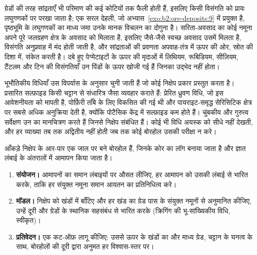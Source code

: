 ग्रेडों की तरह सांद्रताएँ भी परिमाण की कई कोटियों तक फैली होती हैं, इसलिए किसी विसंगति को प्रायः लघुगणकों पर
परखा जाता है; एक सरल देहली, जो अभ्यास~\ref{exo:b2:ore-deposits:9} में प्रयुक्त है, पृष्ठभूमि के लघुगणकों का
माध्य जमा उनके मानक विचलन का दोगुना है। सरिता-अवसाद का कोई नमूना अपने पूरे जलग्रहण क्षेत्र के अवसाद को
मिलाता है, इसलिए जैसे-जैसे स्वच्छ अवसाद उसमें मिलता है, विसंगति अनुप्रवाह में मंद होती जाती है, और सांद्रताओं
की प्रवणता अपवाह-तंत्र में ऊपर की ओर, स्रोत की दिशा में, संकेत करती है। दबे हुए पेग्मेटाइटों के ऊपर की
मृदाओं में लिथियम, रूबिडियम, सीज़ियम, टैंटलम और टिन की विसंगतियाँ उन पिंडों के ऊपर खोजी गई हैं
जिनका उद्भेद नहीं होता।

भूभौतिकीय विधियाँ उस विपर्यास के अनुसार चुनी जाती हैं जो कोई निक्षेप प्रकार प्रस्तुत करता है। प्रसारित सल्फ़ाइड
किसी चट्टान से संधारित्र जैसा व्यवहार कराते हैं: प्रेरित ध्रुवण विधि, जो इस आवेशनीयता को मापती है, पोर्फ़िरी
ताँबे के लिए विकसित की गई थी और पायराइट-समृद्ध सेरिसिटिक क्षेत्र पर सबसे अधिक अनुक्रिया देती है, क्योंकि
पोटैसिक केंद्र में सल्फ़ाइड कम होते हैं। चुंबकीय और गुरुत्व सर्वेक्षण उन  का मानचित्रण करते हैं जिनसे
निक्षेप संबंधित हैं। कोई भी विधि अयस्क को
सीधे नहीं देखती, और हर व्याख्या तब तक अद्वितीय नहीं होती जब तक कोई बोरहोल उसकी परीक्षा न करे।

\begin{method}[आमापनों से संसाधन-अनुमान तक]\label{met:b2:ore-deposits:resource}
आँकड़े निक्षेप के आर-पार एक जाल पर बने बोरहोल हैं, जिनके कोर का लॉग बनाया जाता है और ज्ञात लंबाई के
अंतरालों में आमापन किया जाता है।
\begin{enumerate}
  \item \textbf{संयोजन।} आमापनों का समान लंबाइयों पर औसत लीजिए, हर आमापन को उसकी लंबाई से
        भारित करके, ताकि हर संयुक्त नमूना समान आयतन का प्रतिनिधित्व करे।
  \item \textbf{मॉडल।} निक्षेप को खंडों में बाँटिए और हर खंड का ग्रेड पास के संयुक्त नमूनों से
        अनुमानित कीजिए, उन्हें दूरी और ग्रेडों के स्थानिक सहसंबंध से भारित करके
        (क्रिगिंग की भू-सांख्यिकीय विधि, स्वीकृत)।
  \item \textbf{प्रतिवेदन।} एक कट-ऑफ़ लागू कीजिए: उससे ऊपर के खंडों का  और माध्य ग्रेड, चट्टान
        के घनत्व के साथ, बोरहोलों की दूरी द्वारा अनुमत हर विश्वास-स्तर पर।
\end{enumerate}
\end{method}

